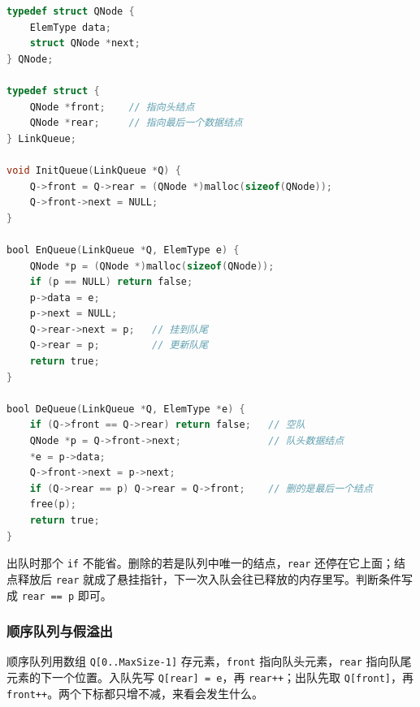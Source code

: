 \begin{lstlisting}[language=C]
typedef struct QNode {
    ElemType data;
    struct QNode *next;
} QNode;

typedef struct {
    QNode *front;    // 指向头结点
    QNode *rear;     // 指向最后一个数据结点
} LinkQueue;

void InitQueue(LinkQueue *Q) {
    Q->front = Q->rear = (QNode *)malloc(sizeof(QNode));
    Q->front->next = NULL;
}

bool EnQueue(LinkQueue *Q, ElemType e) {
    QNode *p = (QNode *)malloc(sizeof(QNode));
    if (p == NULL) return false;
    p->data = e;
    p->next = NULL;
    Q->rear->next = p;   // 挂到队尾
    Q->rear = p;         // 更新队尾
    return true;
}

bool DeQueue(LinkQueue *Q, ElemType *e) {
    if (Q->front == Q->rear) return false;   // 空队
    QNode *p = Q->front->next;               // 队头数据结点
    *e = p->data;
    Q->front->next = p->next;
    if (Q->rear == p) Q->rear = Q->front;    // 删的是最后一个结点
    free(p);
    return true;
}
\end{lstlisting}

出队时那个 \texttt{if} 不能省。删除的若是队列中唯一的结点，\texttt{rear} 还停在它上面；结点释放后 \texttt{rear} 就成了悬挂指针，下一次入队会往已释放的内存里写。判断条件写成 \texttt{rear == p} 即可。

\subsubsection*{顺序队列与假溢出}

顺序队列用数组 \texttt{Q[0..MaxSize-1]} 存元素，\texttt{front} 指向队头元素，\texttt{rear} 指向队尾元素的下一个位置。入队先写 \texttt{Q[rear] = e}，再 \texttt{rear++}；出队先取 \texttt{Q[front]}，再 \texttt{front++}。两个下标都只增不减，来看会发生什么。

